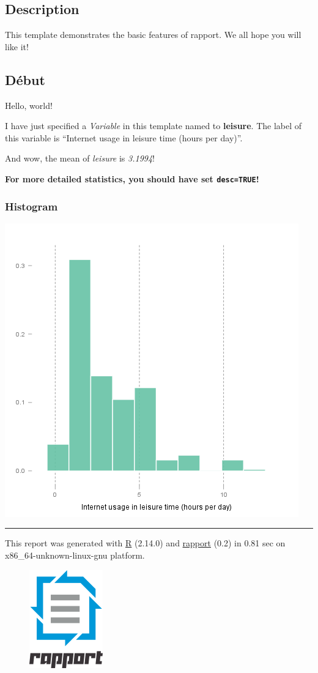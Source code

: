 \documentclass[]{article}
\makeatletter
\def\maxwidth{\ifdim\Gin@nat@width>\linewidth\linewidth
\else\Gin@nat@width\fi}
\let\Oldincludegraphics\includegraphics
\renewcommand{\includegraphics}[1]{\Oldincludegraphics[width=\maxwidth]{#1}}
\makeatother
\begin{document}
\subsection{Description}

This template demonstrates the basic features of rapport. We all hope
you will like it!

\subsection{Début}

Hello, world!

I have just specified a \emph{Variable} in this template named to
\textbf{leisure}. The label of this variable is ``Internet usage in
leisure time (hours per day)''.

And wow, the mean of \emph{leisure} is \emph{3.1994}!

\textbf{For more detailed statistics, you should have set
\texttt{desc=TRUE}!}

\subsubsection{Histogram}

\href{7779958734926ffb57756d6c1d01b75b-hires.png}{\includegraphics{7779958734926ffb57756d6c1d01b75b.png}}

\begin{center}\rule{3in}{0.4pt}\end{center}

This report was generated with \href{http://www.r-project.org/}{R}
(2.14.0) and \href{http://al3xa.github.com/rapport/}{rapport} (0.2) in
0.81 sec on x86\_64-unknown-linux-gnu platform.

\begin{figure}[htbp]
\centering
\includegraphics{images/logo.png}
\caption{}
\end{figure}
\end{document}
